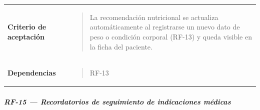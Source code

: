 \documentclass[
]{article}
\begin{document}
{\begin{longtable}[]{@{}
  >{\raggedright\arraybackslash}p{}
  >{\raggedright\arraybackslash}p{}@{}}
\textbf{Criterio de aceptación} &
\begin{minipage}[t]{\linewidth}\raggedright
\begin{quote}
La recomendación nutricional se actualiza automáticamente al registrarse
un nuevo dato de peso o condición corporal (RF-13) y queda visible en la
ficha del paciente.
\end{quote}
\end{minipage} \\
\textbf{Dependencias} & \begin{minipage}[t]{\linewidth}\raggedright
\begin{quote}
RF-13
\end{quote}
\end{minipage} \\
\end{longtable}
}

\subparagraph{RF-15 --- Recordatorios de seguimiento de indicaciones
médicas}\label{rf-15-recordatorios-de-seguimiento-de-indicaciones-muxe9dicas}
\end{document}
